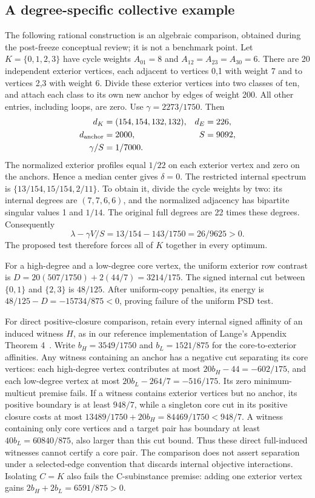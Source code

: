 \documentclass[sigconf,anonymous,review]{acmart}
\newcommand{\1}{\mathbf{1}}
\begin{document}
\subsection{A degree-specific collective example}
The following rational construction is an algebraic comparison, obtained
during the post-freeze conceptual review; it is not a benchmark point.
Let $K=\{0,1,2,3\}$ have cycle weights
$A_{01}=8$ and $A_{12}=A_{23}=A_{30}=6$.
There are 20 independent exterior vertices, each adjacent to vertices 0,1
with weight 7 and to vertices 2,3 with weight 6. Divide these exterior vertices
into two classes of ten, and attach each class to its own new anchor by edges
of weight 200. All other entries, including loops, are zero. Use
$\gamma=2273/1750$. Then
\begin{align*}
 d_K&=(154,154,132,132),& d_E&=226,\\
 d_{\rm anchor}&=2000,& S&=9092,\\
 \gamma/S&=1/7000.
\end{align*}
The normalized exterior profiles equal $1/22$ on each exterior vertex and zero
on the anchors. Hence a median center gives $\delta=0$. The restricted internal
spectrum is $\{13/154,15/154,2/11\}$. To obtain it, divide the cycle weights
by two: its internal degrees are $(7,7,6,6)$, and the normalized adjacency has
bipartite singular values 1 and $1/14$. The original full degrees are 22 times
these degrees. Consequently
\[
 \lambda-\gamma V/S=13/154-143/1750=26/9625>0.
\]
The proposed test therefore forces all of $K$ together in every optimum.

For a high-degree and a low-degree core vertex, the uniform exterior row
contrast is
$D=20(507/1750)+2(44/7)=3214/175$.
The signed internal cut between $\{0,1\}$ and $\{2,3\}$ is $48/125$.
After uniform-copy penalties, its energy is
$48/125-D=-15734/875<0$, proving failure of the uniform PSD test.

For direct positive-closure comparison, retain every internal signed affinity
of an induced witness $H$, as in our reference implementation of
Lange's Appendix Theorem 4~\cite{lange2019combinatorial}.
Write $b_H=3549/1750$ and $b_L=1521/875$ for the core-to-exterior affinities.
Any witness containing an anchor has a negative cut separating its core
vertices: each high-degree vertex contributes at most
$20b_H-44=-602/175$, and each low-degree vertex at most
$20b_L-264/7=-516/175$. Its zero minimum-multicut premise fails.
If a witness contains exterior vertices but no anchor, its positive boundary
is at least $948/7$, while a singleton core cut in its positive closure costs
at most $13489/1750+20b_H=84469/1750<948/7$.
A witness containing only core vertices and a target pair has boundary at
least $40b_L=60840/875$, also larger than this cut bound.
Thus these direct full-induced witnesses cannot certify a core pair.
The comparison does not assert separation under a selected-edge convention
that discards internal objective interactions.
Isolating $C=K$ also fails the C-subinstance premise: adding one exterior vertex
gains $2b_H+2b_L=6591/875>0$.
\end{document}
